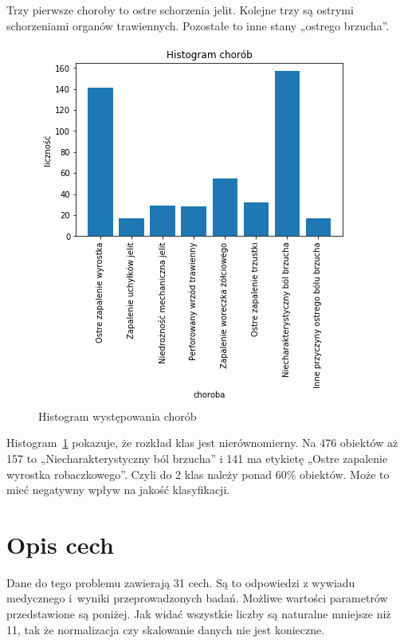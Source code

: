     Trzy pierwsze choroby to ostre schorzenia jelit.
    Kolejne trzy są ostrymi schorzeniami organów trawiennych.
    Pozostałe to inne stany „ostrego brzucha”.

    \begin{figure}[htp]
        \centering
        \includegraphics[scale=0.7]{./img/histogram.png}
        \caption{Histogram występowania chorób}
        \label{hist}
    \end{figure}

    Histogram~\ref{hist} pokazuje, że rozkład klas jest nierównomierny.
    Na 476 obiektów aż 157 to „Niecharakterystyczny ból brzucha” i 141 ma etykietę „Ostre zapalenie wyrostka robaczkowego”.
    Czyli do 2 klas należy ponad 60\% obiektów.
    Może to mieć negatywny wpływ na jakość klasyfikacji.

    \section{Opis cech}\label{sec:opisCech}

    Dane do tego problemu zawierają 31 cech.
    Są to odpowiedzi z wywiadu medycznego i~wyniki przeprowadzonych badań.
    Możliwe wartości parametrów przedstawione są poniżej.
    Jak widać wszystkie liczby są naturalne mniejsze niż 11, tak że normalizacja czy skalowanie danych nie jest konieczne.

    

